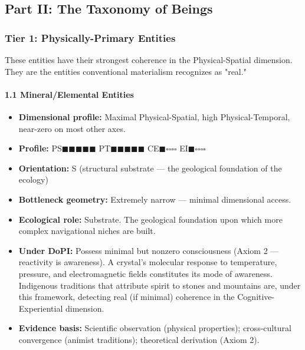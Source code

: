 \subsection*{Part II: The Taxonomy of Beings}


\subsubsection*{Tier 1: Physically-Primary Entities}


These entities have their strongest coherence in the Physical-Spatial dimension. They are the entities conventional materialism recognizes as "real."


\paragraph*{1.1 Mineral/\allowbreak Elemental Entities}

\begin{itemize}[nosep,leftmargin=*]
  \item \textbf{Dimensional profile:} Maximal Physical-Spatial, high Physical-Temporal, near-zero on most other axes.
  \item \textbf{Profile:} PS$\blacksquare$$\blacksquare$$\blacksquare$$\blacksquare$$\blacksquare$ PT$\blacksquare$$\blacksquare$$\blacksquare$$\blacksquare$$\blacksquare$ CE$\blacksquare$$\square$$\square$$\square$$\square$ EI$\blacksquare$$\square$$\square$$\square$$\square$
  \item \textbf{Orientation:} S (structural substrate — the geological foundation of the ecology)
  \item \textbf{Bottleneck geometry:} Extremely narrow — minimal dimensional access.
  \item \textbf{Ecological role:} Substrate. The geological foundation upon which more complex navigational niches are built.
  \item \textbf{Under DoPI:} Possess minimal but nonzero consciousness (Axiom 2 — reactivity is awareness). A crystal's molecular response to temperature, pressure, and electromagnetic fields constitutes its mode of awareness. Indigenous traditions that attribute spirit to stones and mountains are, under this framework, detecting real (if minimal) coherence in the Cognitive-Experiential dimension.
  \item \textbf{Evidence basis:} Scientific observation (physical properties); cross-cultural convergence (animist traditions); theoretical derivation (Axiom 2).
\end{itemize}


